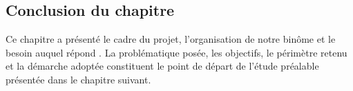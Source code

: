 \subsection{Conclusion du chapitre}

Ce chapitre a présenté le cadre du projet, l'organisation de notre binôme et le besoin
auquel répond \equipay. La problématique posée, les objectifs, le périmètre retenu et la
démarche adoptée constituent le point de départ de l'étude préalable présentée dans le
chapitre suivant.
